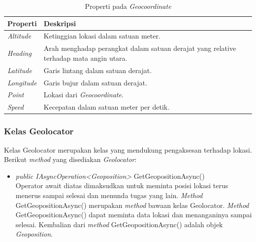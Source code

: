 \begin{table}[h]
	\centering
		\begin{tabular}{ |p{4cm}|p{10cm}|}
				\hline
				Properti & Deskripsi \\ \hline
				\textit{Altitude} & Ketinggian lokasi dalam satuan meter. \\ \hline
				\textit{Heading} & Arah menghadap perangkat dalam satuan derajat yang relative terhadap mata angin utara. \\ \hline
				\textit{Latitude} & Garis lintang dalam satuan derajat. \\ \hline
				\textit{Longitude}  & Garis bujur dalam satuan derajat. \\ \hline
				\textit{Point} & Lokasi dari \textit{Geocoordinate}. \\ \hline
				\textit{Speed} & Kecepatan dalam satuan meter per detik. \\ \hline
				\hline
		\end{tabular}
	\caption{Properti pada \textit{Geocoordinate}}
	\label{tab:PropertiPadaKelasGeocoordinate}
\end{table} 

\subsubsection{Kelas Geolocator}
\label{subsubsec:Kelas Geolocator}
\hspace{0.5cm} Kelas Geolocator merupakan kelas yang mendukung pengaksesan terhadap lokasi. Berikut \textit{method} yang disediakan \textit{Geolocator}:

\begin{itemize}
	\item \textit{public IAsyncOperation<Geoposition>} GetGeopositionAsync() \\
		Operator await diatas dimaksudkan untuk meminta posisi lokasi terus menerus sampai selesai dan menunda tugas yang lain. \textit{Method} GetGeopositionAsync() merupakan \textit{method} bawaan kelas Geolocator. \textit{Method} GetGeopositionAsync() dapat meminta data lokasi dan menanganinya sampai selesai. Kembalian dari \textit{method} GetGeopositionAsync() adalah objek \textit{Geoposition}.
\end{itemize}

